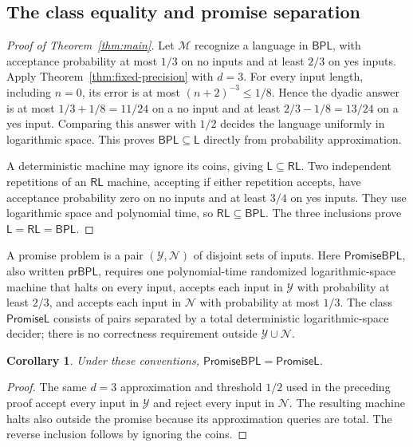 \documentclass[11pt]{article}
\numberwithin{equation}{section}
\newtheorem{corollary}[theorem]{Corollary}
\theoremstyle{definition}
\theoremstyle{remark}
\newcommand{\RL}{\mathsf{RL}}
\newcommand{\Lclass}{\mathsf L}
\newcommand{\BPL}{\mathsf{BPL}}
\begin{document}
\subsection{The class equality and promise separation}

\begin{proof}[Proof of Theorem~\ref{thm:main}]
Let $\mathcal M$ recognize a language in $\BPL$, with acceptance
probability at most $1/3$ on no inputs and at least $2/3$ on yes
inputs. Apply Theorem~\ref{thm:fixed-precision} with $d=3$.
For every input length, including $n=0$, its error is at most
$(n+2)^{-3}\le1/8$. Hence the dyadic answer is at most
$1/3+1/8=11/24$ on a no input and at least
$2/3-1/8=13/24$ on a yes input. Comparing this answer with $1/2$
decides the language uniformly in logarithmic space. This proves
$\BPL\subseteq\Lclass$ directly from probability approximation.

A deterministic machine may ignore its coins, giving
$\Lclass\subseteq\RL$. Two independent repetitions of an $\RL$
machine, accepting if either repetition accepts, have acceptance
probability zero on no inputs and at least $3/4$ on yes inputs.
They use logarithmic space and polynomial time, so
$\RL\subseteq\BPL$. The three inclusions prove
$\Lclass=\RL=\BPL$.
\end{proof}

A promise problem is a pair $({\mathcal{Y}},{\mathcal{N}})$ of disjoint sets of inputs.
Here $\mathsf{PromiseBPL}$, also written $\mathsf{prBPL}$,
requires one polynomial-time randomized
logarithmic-space machine that halts on every input, accepts each
input in ${\mathcal{Y}}$ with probability at least $2/3$, and accepts each
input in ${\mathcal{N}}$ with probability at most $1/3$.
The class $\mathsf{PromiseL}$ consists of pairs separated by a total
deterministic logarithmic-space decider; there is no correctness
requirement outside ${\mathcal{Y}}\cup {\mathcal{N}}$.

\begin{corollary}\label{cor:promise-bpl}
Under these conventions,
$\mathsf{PromiseBPL}=\mathsf{PromiseL}$.
\end{corollary}

\begin{proof}
The same $d=3$ approximation and threshold $1/2$ used in the preceding
proof accept every input in ${\mathcal{Y}}$ and reject every input in ${\mathcal{N}}$.
The resulting machine halts also outside the promise because its
approximation queries are total. The reverse inclusion follows by
ignoring the coins.
\end{proof}
\end{document}
